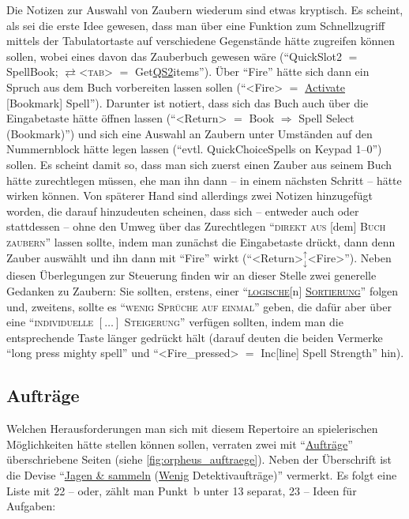 \documentclass[a5paper,pagesize]{scrbook}
\begin{document}
Die Notizen zur Auswahl von Zaubern wiederum sind etwas kryptisch.
Es scheint, als sei die erste Idee gewesen, dass man über eine Funktion zum Schnellzugriff mittels der Tabulatortaste auf verschiedene Gegenstände hätte zugreifen können sollen, wobei eines davon das Zauberbuch gewesen wäre (\enquote{QuickSlot2 $=$ SpellBook; $\rightleftarrows$<\textsc{tab}> $=$ Get\uline{QS2}items}).
Über \enquote{Fire} hätte sich dann ein Spruch aus dem Buch vorbereiten lassen sollen (\enquote{<Fire> $=$ \uline{Activate} [Bookmark] Spell}).
Darunter ist notiert, dass sich das Buch auch über die Eingabetaste hätte öffnen lassen (\enquote{<Return> $=$ Book $\Rightarrow$ Spell Select (Bookmark)}) und sich eine Auswahl an Zaubern unter Umständen auf den Nummernblock hätte legen lassen (\enquote{evtl. QuickChoiceSpells on Keypad 1--0}) sollen.
Es scheint damit so, dass man sich zuerst einen Zauber aus seinem Buch hätte zurechtlegen müssen, ehe man ihn dann -- in einem nächsten Schritt -- hätte wirken können.
Von späterer Hand sind allerdings zwei Notizen hinzugefügt worden, die darauf hinzudeuten scheinen, dass sich -- entweder auch oder stattdessen -- ohne den Umweg über das Zurechtlegen \enquote{\textsc{direkt aus} [dem] \textsc{Buch zaubern}} lassen sollte, indem man zunächst die Eingabetaste drückt, dann denn Zauber auswählt und ihn dann mit \enquote{Fire} wirkt (\enquote{<Return>$_{\downarrow}^{\uparrow}$<Fire>}).
Neben diesen Überlegungen zur Steuerung finden wir an dieser Stelle zwei generelle Gedanken zu Zaubern:
Sie sollten, erstens, einer \enquote{\textsc{\uline{logische}}[n] \textsc{\uline{Sortierung}}} folgen und, zweitens, sollte es \enquote{\textsc{wenig Sprüche auf einmal}} geben, die dafür aber über eine \enquote{\textsc{individuelle $[\dots]$ Steigerung}} verfügen sollten, indem man die entsprechende Taste länger gedrückt hält (darauf deuten die beiden Vermerke \enquote{long press mighty spell} und \enquote{<Fire\_pressed> $=$ Inc[line] Spell Strength} hin).\autocite[S.~3]{orpheus_interface}


\subsection{Aufträge}\label{sec:orpheus_mechanik_auftraege}
Welchen Herausforderungen man sich mit diesem Repertoire an spielerischen Möglichkeiten hätte stellen können sollen, verraten zwei mit \enquote{\uline{Aufträ\-ge}} überschriebene Seiten (siehe \autoref{fig:orpheus_auftraege}).\autocite[Vgl.][S.~16--17]{orpheus_b_scribbles}
Neben der Überschrift ist die Devise \enquote{\uline{Jagen \& sammeln} (\uline{Wenig} Detektivaufträge)} vermerkt.
Es folgt eine Liste mit 22 -- oder, zählt man Punkt~b unter 13 separat, 23 -- Ideen für Aufgaben:
\end{document}
